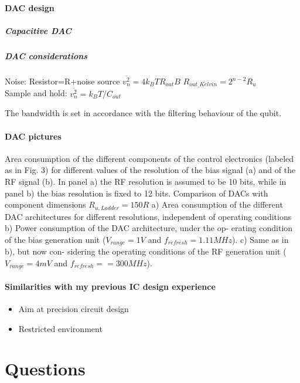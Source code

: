 \documentclass[a4paper,12pt]{article} %
\begin{document}
\paragraph{DAC design}
\subparagraph{Capacitive DAC}
\subparagraph{DAC considerations} Noise: Resistor=R+noise source  $ \overline{v_n^2} = 4k_BTR_{out}B  $ \hspace{2mm}
$R_{out\_Kelvin}=2^{n-2}R_u$ \\
Sample and hold: $\overline{v_n^2} = k_BT/C_{out}$


The bandwidth is set in accordance with the filtering behaviour of the qubit.


\paragraph{DAC pictures}
Area consumption of the different components of the
control electronics (labeled as in Fig. 3) for different values of
the resolution of the bias signal (a) and of the RF signal (b).
In panel a) the RF resolution is assumed to be 10 bits, while
in panel b) the bias resolution is fixed to 12 bits.
Comparison of DACs with component dimensions
 $R_{u,Ladder} = 150R$
a) Area consumption of the different DAC architectures for
different resolutions, independent of operating conditions b)
Power consumption of the DAC architecture, under the op-
erating condition of the bias generation unit ($V_{range} = 1 V$
and $f_{refresh} = 1.11 MHz$). c) Same as in b), but now con-
sidering the operating conditions of the RF generation unit
($V_{range} = 4 mV$ and $f_{refresh} = = 300 MHz$).

\paragraph{Similarities with my previous IC design experience}
\begin{itemize}
    \item Aim at precision circuit design
    \item Restricted environment
\end{itemize}

\section{Questions}
\end{document}
